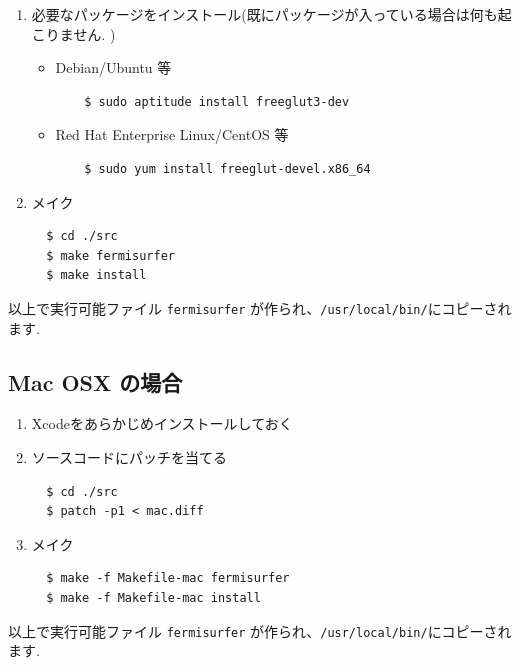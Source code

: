 \documentclass[12pt]{jarticle}
\begin{document}
\begin{enumerate}

\item 必要なパッケージをインストール(既にパッケージが入っている場合は何も起こりません. )

  \begin{itemize}
  \item Debian/Ubuntu 等
    \begin{verbatim}
    $ sudo aptitude install freeglut3-dev
    \end{verbatim}
  \item Red Hat Enterprise Linux/CentOS 等
    \begin{verbatim}
    $ sudo yum install freeglut-devel.x86_64
    \end{verbatim}
  \end{itemize}

\item メイク

\begin{verbatim}
  $ cd ./src
  $ make fermisurfer
  $ make install
\end{verbatim}

\end{enumerate}

以上で実行可能ファイル \texttt{fermisurfer} が作られ、\verb|/usr/local/bin/|にコピーされます.

\subsection{Mac OSX の場合}

\begin{enumerate}

\item Xcodeをあらかじめインストールしておく
\item ソースコードにパッチを当てる
\begin{verbatim}
  $ cd ./src
  $ patch -p1 < mac.diff
\end{verbatim}

\item メイク
\begin{verbatim}
  $ make -f Makefile-mac fermisurfer
  $ make -f Makefile-mac install
\end{verbatim}

\end{enumerate}

以上で実行可能ファイル \texttt{fermisurfer} が作られ、\verb|/usr/local/bin/|にコピーされます.
\end{document}
